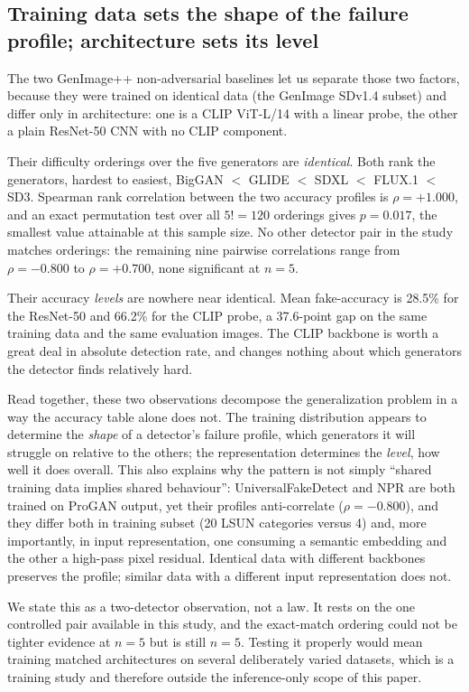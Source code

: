 \documentclass[3p,times,procedia]{elsarticle}
\begin{document}
\subsection{Training data sets the shape of the failure profile;
architecture sets its level}
\label{sec:finding-shape}

The two GenImage++ non-adversarial baselines let us separate those two
factors, because they were trained on identical data (the GenImage SDv1.4
subset) and differ only in architecture: one is a CLIP ViT-L/14 with a
linear probe, the other a plain ResNet-50 CNN with no CLIP component.

Their difficulty orderings over the five generators are \emph{identical}.
Both rank the generators, hardest to easiest, BigGAN $<$ GLIDE $<$ SDXL $<$
FLUX.1 $<$ SD3. Spearman rank correlation between the two accuracy profiles
is $\rho = +1.000$, and an exact permutation test over all $5! = 120$
orderings gives $p = 0.017$, the smallest value attainable at this sample
size. No other detector pair in the study matches orderings: the remaining
nine pairwise correlations range from $\rho = -0.800$ to $\rho = +0.700$,
none significant at $n=5$.

Their accuracy \emph{levels} are nowhere near identical. Mean fake-accuracy
is 28.5\% for the ResNet-50 and 66.2\% for the CLIP probe, a 37.6-point gap
on the same training data and the same evaluation images. The CLIP backbone
is worth a great deal in absolute detection rate, and changes nothing about
which generators the detector finds relatively hard.

Read together, these two observations decompose the generalization problem
in a way the accuracy table alone does not. The training distribution
appears to determine the \emph{shape} of a detector's failure profile,
which generators it will struggle on relative to the others; the
representation determines the \emph{level}, how well it does overall. This
also explains why the pattern is not simply ``shared training data implies
shared behaviour'': UniversalFakeDetect and NPR are both trained on ProGAN
output, yet their profiles anti-correlate ($\rho = -0.800$), and they
differ both in training subset (20 LSUN categories versus 4) and, more
importantly, in input representation, one consuming a semantic embedding
and the other a high-pass pixel residual. Identical data with different
backbones preserves the profile; similar data with a different input
representation does not.

We state this as a two-detector observation, not a law. It rests on the one
controlled pair available in this study, and the exact-match ordering could
not be tighter evidence at $n=5$ but is still $n=5$. Testing it properly
would mean training matched architectures on several deliberately varied
datasets, which is a training study and therefore outside the
inference-only scope of this paper.
\end{document}
